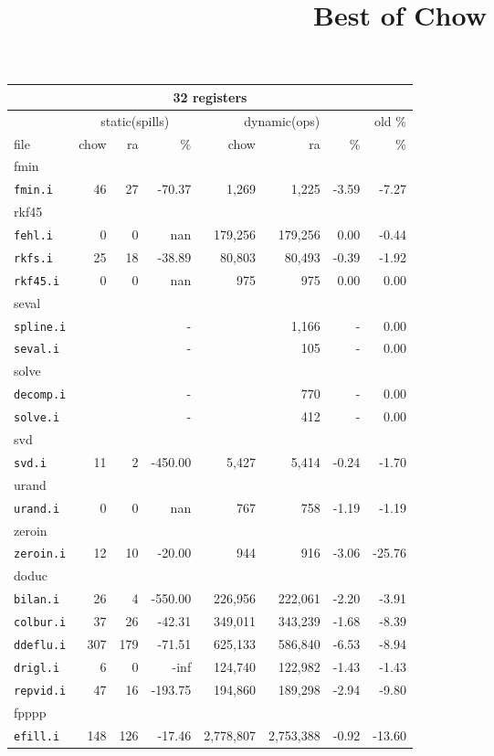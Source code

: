 \documentclass[11pt]{article}
\title{Best of Chow}
\begin{document}
\begin{tabular}{|l|r|r|r|r|r|r|r|}
\hline
\multicolumn{8}{|c|}{32 registers}\\
\hline
&\multicolumn{3}{c}{static(spills)}&\multicolumn{3}{|c|}{dynamic(ops)}&old \%\\
\hline
file&chow&ra&\%&chow&ra&\%&\%\\
\hline

%
%
\multicolumn{8}{|l|}{fmin}\\
\hline
\texttt{fmin.i}&46&27&-70.37&1,269&1,225&-3.59&-7.27 \\
\hline
%
%
\multicolumn{8}{|l|}{rkf45}\\
\hline
\texttt{fehl.i}&0&0&nan&179,256&179,256&0.00&-0.44 \\
\hline
\texttt{rkfs.i}&25&18&-38.89&80,803&80,493&-0.39&-1.92 \\
\hline
\texttt{rkf45.i}&0&0&nan&975&975&0.00&0.00 \\
\hline
%
%
\multicolumn{8}{|l|}{seval}\\
\hline
\texttt{spline.i}&&&-&&1,166&-&0.00 \\
\hline
\texttt{seval.i}&&&-&&105&-&0.00 \\
\hline
%
%
\multicolumn{8}{|l|}{solve}\\
\hline
\texttt{decomp.i}&&&-&&770&-&0.00 \\
\hline
\texttt{solve.i}&&&-&&412&-&0.00 \\
\hline
%
%
\multicolumn{8}{|l|}{svd}\\
\hline
\texttt{svd.i}&11&2&-450.00&5,427&5,414&-0.24&-1.70 \\
\hline
%
%
\multicolumn{8}{|l|}{urand}\\
\hline
\texttt{urand.i}&0&0&nan&767&758&-1.19&-1.19 \\
\hline
%
%
\multicolumn{8}{|l|}{zeroin}\\
\hline
\texttt{zeroin.i}&12&10&-20.00&944&916&-3.06&-25.76 \\
\hline
%
%
\multicolumn{8}{|l|}{doduc}\\
\hline
\texttt{bilan.i}&26&4&-550.00&226,956&222,061&-2.20&-3.91 \\
\hline
\texttt{colbur.i}&37&26&-42.31&349,011&343,239&-1.68&-8.39 \\
\hline
\texttt{ddeflu.i}&307&179&-71.51&625,133&586,840&-6.53&-8.94 \\
\hline
\texttt{drigl.i}&6&0&-inf&124,740&122,982&-1.43&-1.43 \\
\hline
\texttt{repvid.i}&47&16&-193.75&194,860&189,298&-2.94&-9.80 \\
\hline
%
%
\multicolumn{8}{|l|}{fpppp}\\
\hline
\texttt{efill.i}&148&126&-17.46&2,778,807&2,753,388&-0.92&-13.60 \\
\hline


\end{tabular}
\end{document}
